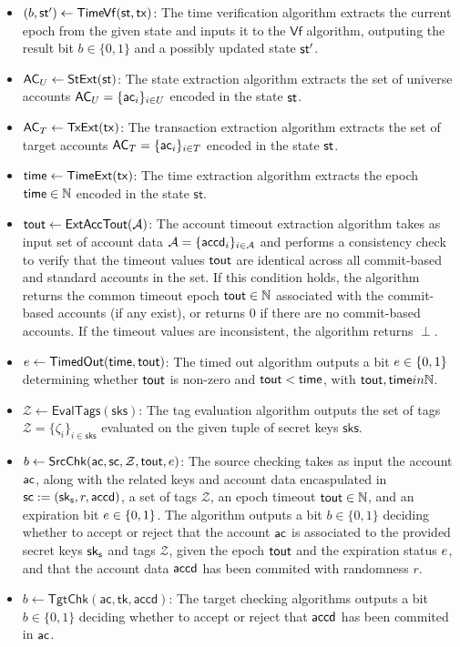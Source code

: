 \begin{definition}
\begin{itemize}
	\item $(b,\mathsf{st}') \gets \mathsf{TimeVf}(\st,\tx)$: The time verification algorithm extracts the current epoch from the given state and inputs it to the $\mathsf{Vf}$ algorithm,  outputing the result bit $b \in \{ 0, 1 \}$ and a possibly updated state $\st'$.
        \item $\mathsf{AC}_U \gets \mathsf{StExt}(\st)$: The state extraction algorithm extracts the set of universe accounts $\mathsf{AC}_U = \{\mathsf{ac}_i\}_{i \in U}$ encoded in the state $\st$.
        \item $\mathsf{AC}_T \gets \mathsf{TxExt}(\mathsf{tx})$: The transaction extraction algorithm extracts the set of target accounts $\mathsf{AC}_T = \{\mathsf{ac}_i\}_{i \in T}$ encoded in the state $\st$.
	\item $\mathsf{time} \gets \mathsf{TimeExt}(\mathsf{tx})$: The time extraction algorithm extracts the epoch $\mathsf{time} \in \mathbb{N}$ encoded in the state $\mathsf{st}$.
	\item $\mathsf{tout} \gets \mathsf{ExtAccTout}(\mathcal{A})$: The account timeout extraction algorithm takes as input set of account data $\mathcal{A} = \{ \mathsf{accd}_i \}_{i \in \mathcal{A}}$ and performs a consistency check to verify that the timeout values $\mathsf{tout}$ are identical across all commit-based and standard accounts in the set. If this condition holds, the algorithm returns the common timeout epoch $\mathsf{tout} \in \mathbb{N}$ associated with the commit-based accounts (if any exist), or returns $0$ if there are no commit-based accounts. If the timeout values are inconsistent, the algorithm returns $\perp$.
	\item $e \gets \mathsf{TimedOut}(\mathsf{time}, \mathsf{tout})$: The timed out algorithm outputs a bit $e \in \{0, 1\}$ determining whether $\mathsf{tout}$ is non-zero and $\mathsf{tout} < \mathsf{time}$, with $\mathsf{tout}, \mathsf{time} in \mathbb{N}$.
	\item $\mathcal{Z} \gets \mathsf{EvalTags}(\mathsf{sks})$: The tag evaluation algorithm outputs the set of tags $\mathcal{Z} = \{ \zeta_i \}_{i \in \mathsf{sks}}$ evaluated on the given tuple of secret keys $\mathsf{sks}$.
	\item $b \gets \mathsf{SrcChk}(\mathsf{ac},\mathsf{sc},\mathcal{Z}, \mathsf{tout}, e)$: The source checking takes as input the account $\mathsf{ac}$, along with the related keys and account data encaspulated in $\mathsf{sc} := (\mathsf{sk}_{\mathsf{s}}, r, \mathsf{accd})$, a set of tags $\mathcal{Z}$, an epoch timeout $\mathsf{tout} \in \mathbb{N}$, and an expiration bit $e \in \{ 0, 1 \}$. The algorithm outputs a bit $b \in \{ 0, 1 \}$ deciding whether to accept or reject that the account $\mathsf{ac}$ is associated to the provided secret keys $\mathsf{sk}_{\mathsf{s}}$ and tags $\mathcal{Z}$, given  the epoch $\mathsf{tout}$ and the expiration status $e$, and that the account data $\mathsf{accd}$ has been commited with randomness $r$.
        \item $b \gets \mathsf{TgtChk}(\mathsf{ac, tk, accd})$: The target checking algorithms outputs a bit $b \in \{ 0, 1 \}$ deciding whether to accept or reject that $\mathsf{accd}$ has been commited in $\mathsf{ac}$. 
    \end{itemize}
\end{definition}

